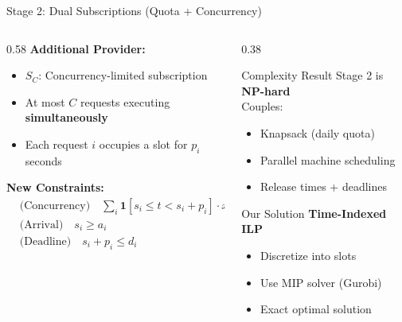 \documentclass[aspectratio=169,10pt]{beamer}
\begin{document}
\begin{frame}{Stage 2: Dual Subscriptions (Quota + Concurrency)}
\begin{columns}[T]
\begin{column}{0.58\textwidth}
\textbf{Additional Provider:}
\begin{itemize}
    \item $S_C$: Concurrency-limited subscription
    \item At most $C$ requests executing \textbf{simultaneously}
    \item Each request $i$ occupies a slot for $p_i$ seconds
\end{itemize}

\vspace{0.3cm}
\textbf{New Constraints:}
\begin{align*}
&\text{(Concurrency)} \quad \sum_{i} \mathbf{1}[s_i \leq t < s_i + p_i] \cdot x_i^C \leq C \\
&\text{(Arrival)} \quad s_i \geq a_i \\
&\text{(Deadline)} \quad s_i + p_i \leq d_i
\end{align*}

\end{column}

\begin{column}{0.38\textwidth}
\begin{alertblock}{Complexity Result}
Stage 2 is \alert{\textbf{NP-hard}}\\[0.2cm]
\small
Couples:
\begin{itemize}
    \item Knapsack (daily quota)
    \item Parallel machine scheduling
    \item Release times + deadlines
\end{itemize}
\end{alertblock}

\vspace{0.3cm}
\begin{block}{Our Solution}
\textbf{Time-Indexed ILP}
\begin{itemize}
    \item Discretize into slots
    \item Use MIP solver (Gurobi)
    \item Exact optimal solution
\end{itemize}
\end{block}
\end{column}
\end{columns}
\end{frame}
\end{document}
